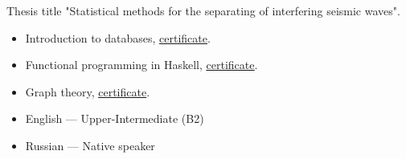 \documentclass[10pt,a4paper,ragged2e,withhyper]{altacv}
\begin{document}
\begin{paracol}{2}
Thesis title "Statistical methods for the separating of interfering seismic waves".

\begin{itemize}

\item Introduction to databases, \href{https://stepik.org/cert/336064}
{\underline{certificate}}.

\item Functional programming in Haskell,
\href{https://stepik.org/cert/272055}
{\underline{certificate}}.

\item Graph theory,
\href{https://coursera.org/share/713ce9741f5f39a7c4d56af9d5e9b60e}
{\underline{certificate}}.

\end{itemize}

\begin{itemize}
\item English — Upper-Intermediate (B2)
\item Russian — Native speaker
\end{itemize}


\end{paracol}
\end{document}
